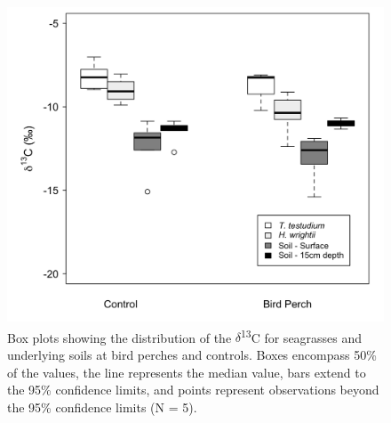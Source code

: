 \begin{figure}
  \centering
  \includegraphics[width=.95\textwidth]{Figures/chapter1/fig10}
\caption[$\delta$\textsuperscript{13}C for seagrasses and underlying soils]{Box plots showing the distribution of the $\delta$\textsuperscript{13}C for seagrasses and underlying soils at bird perches and controls. Boxes encompass 50\% of the values, the line represents the median value, bars extend to the 95\% confidence limits, and points represent observations beyond the 95\% confidence limits (N = 5). }
  \label{fig:1fig10}
\end{figure}
